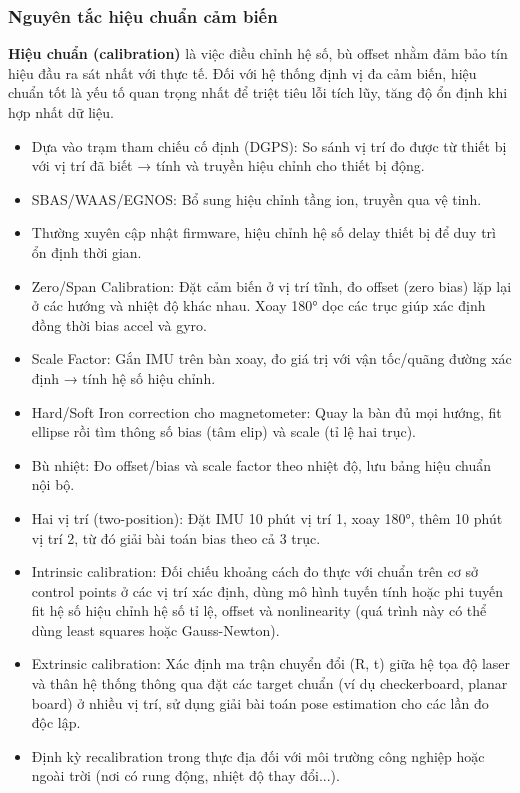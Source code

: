 \subsubsection{Nguyên tắc hiệu chuẩn cảm biến}
\textbf{Hiệu chuẩn (calibration)} là việc điều chỉnh hệ số, bù offset nhằm đảm bảo tín hiệu đầu ra sát nhất với thực tế. Đối với hệ thống định vị đa cảm biến, hiệu chuẩn tốt là yếu tố quan trọng nhất để triệt tiêu lỗi tích lũy, tăng độ ổn định khi hợp nhất dữ liệu.
\begin{itemize}
    \item Dựa vào trạm tham chiếu cố định (DGPS): So sánh vị trí đo được từ thiết bị với vị trí đã biết → tính và truyền hiệu chỉnh cho thiết bị động.
    \item SBAS/WAAS/EGNOS: Bổ sung hiệu chỉnh tầng ion, truyền qua vệ tinh.
    \item Thường xuyên cập nhật firmware, hiệu chỉnh hệ số delay thiết bị để duy trì ổn định thời gian.
\end{itemize}
\begin{itemize}
    \item Zero/Span Calibration: Đặt cảm biến ở vị trí tĩnh, đo offset (zero bias) lặp lại ở các hướng và nhiệt độ khác nhau. Xoay 180° dọc các trục giúp xác định đồng thời bias accel và gyro.
    \item Scale Factor: Gắn IMU trên bàn xoay, đo giá trị với vận tốc/quãng đường xác định → tính hệ số hiệu chỉnh.
    \item Hard/Soft Iron correction cho magnetometer: Quay la bàn đủ mọi hướng, fit ellipse rồi tìm thông số bias (tâm elip) và scale (tỉ lệ hai trục).
    \item Bù nhiệt: Đo offset/bias và scale factor theo nhiệt độ, lưu bảng hiệu chuẩn nội bộ.
    \item Hai vị trí (two-position): Đặt IMU 10 phút vị trí 1, xoay 180°, thêm 10 phút vị trí 2, từ đó giải bài toán bias theo cả 3 trục.
\end{itemize}
\begin{itemize}
    \item Intrinsic calibration: Đối chiếu khoảng cách đo thực với chuẩn trên cơ sở control points ở các vị trí xác định, dùng mô hình tuyến tính hoặc phi tuyến fit hệ số hiệu chỉnh hệ số tỉ lệ, offset và nonlinearity (quá trình này có thể dùng least squares hoặc Gauss-Newton).
    \item Extrinsic calibration: Xác định ma trận chuyển đổi (R, t) giữa hệ tọa độ laser và thân hệ thống thông qua đặt các target chuẩn (ví dụ checkerboard, planar board) ở nhiều vị trí, sử dụng giải bài toán pose estimation cho các lần đo độc lập.
    \item Định kỳ recalibration trong thực địa đối với môi trường công nghiệp hoặc ngoài trời (nơi có rung động, nhiệt độ thay đổi...).
\end{itemize}
